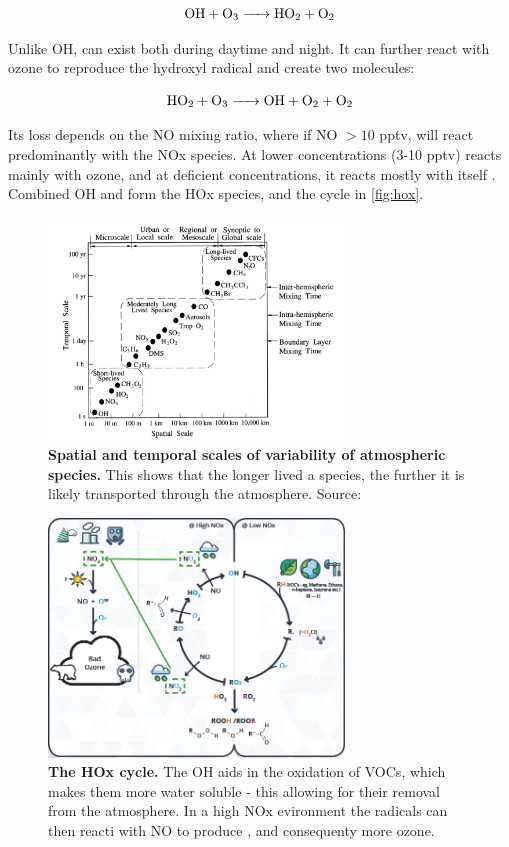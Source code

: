 \begin{equation}
  \ce{OH + O3 -> HO2 + O2}
\end{equation}

Unlike OH,  can exist both during daytime and night. It can further react with ozone to reproduce the hydroxyl radical and create two  molecules:

\begin{equation}
  \ce{HO2 + O3 -> OH + O2 + O2}
\end{equation}

Its loss depends on the NO mixing ratio, where if NO $>10$ pptv,  will react predominantly with the NOx species. At lower concentrations (3-10 pptv)  reacts mainly with ozone, and at deficient concentrations, it reacts mostly with itself \citep{finlayson}. Combined OH and  form the HOx species, and the cycle in \autoref{fig:hox}.

\begin{figure}[H]
  \centering
  \includegraphics[width=0.7\textwidth]{timescales.png}
  \caption{\textbf{Spatial and temporal scales of variability of atmospheric species.} This shows that the longer lived a species, the further it is likely transported through the atmosphere. Source: \citep{transporttime}}
  \label{fig:timescales}
\end{figure}

\begin{figure}[H]
    \centering
    \includegraphics[width=0.7\textwidth]{hoxcycle.png}
    \caption{\textbf{The HOx cycle.} The OH aids in the oxidation of VOCs, which makes them more water soluble - this allowing for their removal from the atmosphere. In a high NOx evironment the  radicals can then reacti with NO to produce , and consequenty more ozone.}
    \label{fig:hox}
\end{figure}

